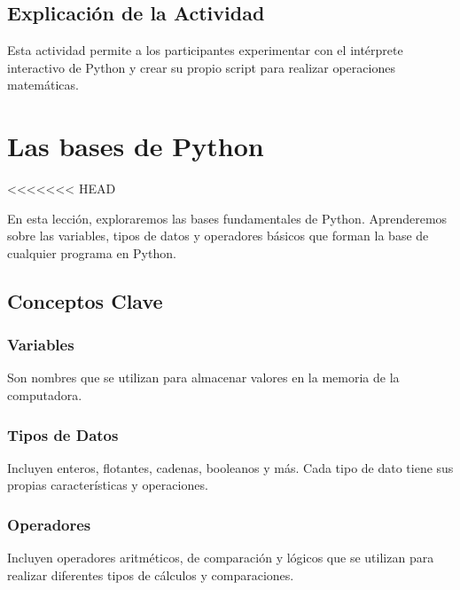 \documentclass[
  a4paper,
  onepage,
  openany]{scrreprt}
\begin{document}
\hypertarget{explicaciuxf3n-de-la-actividad-3}{%
\section{Explicación de la
Actividad}\label{explicaciuxf3n-de-la-actividad-3}}

Esta actividad permite a los participantes experimentar con el
intérprete interactivo de Python y crear su propio script para realizar
operaciones matemáticas.

\hypertarget{las-bases-de-python}{%
\chapter{Las bases de Python}\label{las-bases-de-python}}

\textless\textless\textless\textless\textless\textless\textless{} HEAD

En esta lección, exploraremos las bases fundamentales de Python.
Aprenderemos sobre las variables, tipos de datos y operadores básicos
que forman la base de cualquier programa en Python.

\hypertarget{conceptos-clave-4}{%
\section{Conceptos Clave}\label{conceptos-clave-4}}

\hypertarget{variables}{%
\subsection{Variables}\label{variables}}

Son nombres que se utilizan para almacenar valores en la memoria de la
computadora.

\hypertarget{tipos-de-datos}{%
\subsection{Tipos de Datos}\label{tipos-de-datos}}

Incluyen enteros, flotantes, cadenas, booleanos y más. Cada tipo de dato
tiene sus propias características y operaciones.

\hypertarget{operadores}{%
\subsection{Operadores}\label{operadores}}

Incluyen operadores aritméticos, de comparación y lógicos que se
utilizan para realizar diferentes tipos de cálculos y comparaciones.
\end{document}
